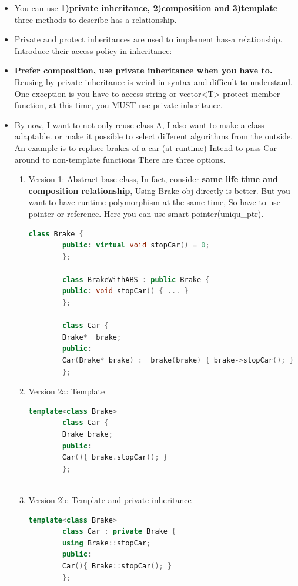 \documentclass[a4paper,11pt,twoside]{book}
\begin{document}
\begin{itemize}
	\item You can use \textbf{1)private inheritance, 2)composition and 3)template} three methods to describe has-a relationship.
	
	\item Private and protect inheritances are used to implement has-a relationship. Introduce their access policy in inheritance:

	\item \textbf{Prefer composition, use private inheritance when you have to.} Reusing by private inheritance is weird in syntax and difficult to understand. One exception is you have to access string or vector<T> protect member function, at this time, you MUST use private inheritance.
	
	\item By now, I want to not only reuse class A, I also want to make a class adaptable. or make it possible to select different algorithms from the outside.  An example is  to replace brakes of a car (at runtime) Intend to pass Car around to non-template functions There are three options.
	\begin{enumerate}
		\item Version 1: Abstract base class, In fact, consider \textbf{same life time and composition relationship},  Using Brake obj directly is better. But you want to have runtime polymorphism at the same time, So have to use pointer or reference. Here you can use smart pointer(uniqu\_ptr).
		\begin{lstlisting}[frame=single, language=c++]
		class Brake {
		public: virtual void stopCar() = 0;
		};
		
		class BrakeWithABS : public Brake {
		public: void stopCar() { ... }
		};
		
		class Car {
		Brake* _brake;
		public:
		Car(Brake* brake) : _brake(brake) { brake->stopCar(); }
		};
		\end{lstlisting}
		
		\item Version 2a: Template
		
		\begin{lstlisting}[frame=single, language=c++]
		template<class Brake>
		class Car {
		Brake brake;
		public:
		Car(){ brake.stopCar(); }
		};
		
		\end{lstlisting}
		\item Version 2b: Template and private inheritance
		\begin{lstlisting}[frame=single, language=c++]
		template<class Brake>
		class Car : private Brake {
		using Brake::stopCar;
		public:
		Car(){ Brake::stopCar(); }
		};
		\end{lstlisting}
	\end{enumerate}
	

\end{itemize}
\end{document}
